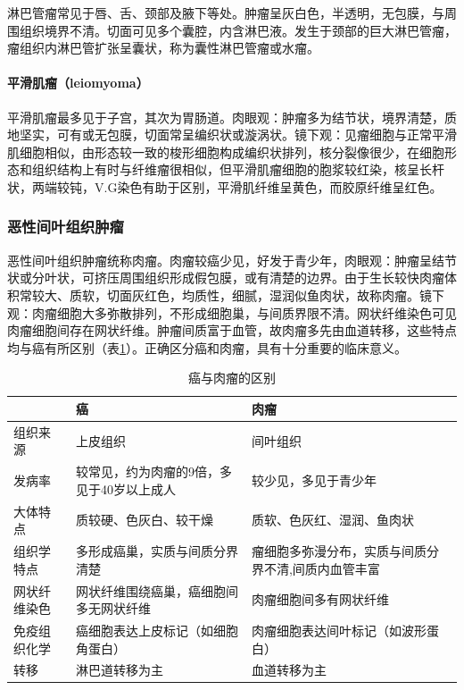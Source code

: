 淋巴管瘤常见于唇、舌、颈部及腋下等处。肿瘤呈灰白色，半透明，无包膜，与周围组织境界不清。切面可见多个囊腔，内含淋巴液。发生于颈部的巨大淋巴管瘤，瘤组织内淋巴管扩张呈囊状，称为囊性淋巴管瘤或水瘤。

\paragraph{平滑肌瘤（leiomyoma）}
平滑肌瘤最多见于子宫，其次为胃肠道。肉眼观：肿瘤多为结节状，境界清楚，质地坚实，可有或无包膜，切面常呈编织状或漩涡状。镜下观：见瘤细胞与正常平滑肌细胞相似，由形态较一致的梭形细胞构成编织状排列，核分裂像很少，在细胞形态和组织结构上有时与纤维瘤很相似，但平滑肌瘤细胞的胞浆较红染，核呈长杆状，两端较钝，V.G染色有助于区别，平滑肌纤维呈黄色，而胶原纤维呈红色。

\subsubsection{恶性间叶组织肿瘤}

恶性间叶组织肿瘤统称肉瘤。肉瘤较癌少见，好发于青少年，肉眼观：肿瘤呈结节状或分叶状，可挤压周围组织形成假包膜，或有清楚的边界。由于生长较快肉瘤体积常较大、质软，切面灰红色，均质性，细腻，湿润似鱼肉状，故称肉瘤。镜下观：肉瘤细胞大多弥散排列，不形成细胞巢，与间质界限不清。网状纤维染色可见肉瘤细胞间存在网状纤维。肿瘤间质富于血管，故肉瘤多先由血道转移，这些特点均与癌有所区别（表\ref{tab5-4}）。正确区分癌和肉瘤，具有十分重要的临床意义。

\begin{table}[ht]
  \caption{癌与肉瘤的区别}
  \label{tab5-4}
  \centering
  \begin{tabular}{lp{5cm}p{5cm}}
    \toprule
                 & 癌                                        & 肉瘤                                                \\
    \midrule
    组织来源     & 上皮组织                                  & 间叶组织                                            \\
    发病率       & 较常见，约为肉瘤的9倍，多见于40岁以上成人
                 & 较少见，多见于青少年                                                                            \\
    大体特点     & 质较硬、色灰白、较干燥                    & 质软、色灰红、湿润、鱼肉状                          \\
    组织学特点   & 多形成癌巢，实质与间质分界清楚            & 瘤细胞多弥漫分布，实质与间质分界不清,间质内血管丰富 \\
    网状纤维染色 & 网状纤维围绕癌巢，癌细胞间多无网状纤维    & 肉瘤细胞间多有网状纤维                              \\
    免疫组织化学 & 癌细胞表达上皮标记（如细胞角蛋白）        & 肉瘤细胞表达间叶标记（如波形蛋白）                  \\
    转移         & 淋巴道转移为主                            & 血道转移为主                                        \\
    \bottomrule
  \end{tabular}
\end{table}


